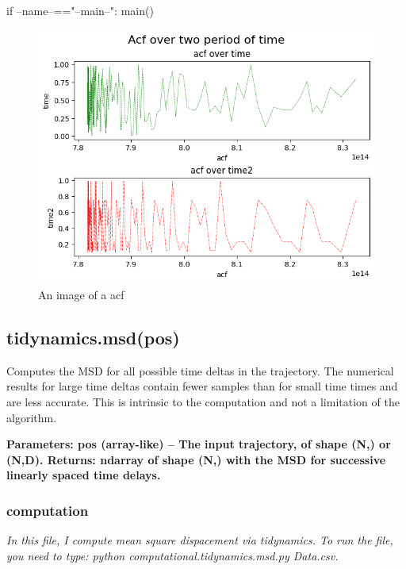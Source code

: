 \documentclass[12pt, a4paper, twoside]{report}
\begin{document}
if --name--=="--main--":\newline
\hspace*{10mm}     main()  \newpage


\begin{figure}[htp]
    \centering
    \includegraphics[width=17cm]{acf.png}
    \caption{An image of a acf}
    \label{fig:acf}
\end{figure}\newpage



\subsection{tidynamics.msd(pos)}

Computes the MSD for all possible time deltas in the trajectory. The numerical results for large time deltas contain fewer samples than for small time times and are less accurate. This is intrinsic to the computation and not a limitation of the algorithm.


\textbf{
Parameters:	pos (array-like) – The input trajectory, of shape (N,) or (N,D).\newline
Returns:	ndarray of shape (N,) with the MSD for successive linearly spaced time delays.}

\subsubsection{computation}


\textit{In this file, I compute mean square dispacement via tidynamics.\newline
To run the file, you need to type: python  computational.tidynamics.msd.py Data.csv.}\newline
\end{document}
